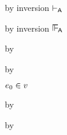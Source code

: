 {\begin{lamportproof*}
    \begin{pfproof}
        \begin{pfproof}
          by inversion $\vdash_{\mathsf{A}}$
        \end{pfproof}
        \begin{pfproof}
          by inversion $\sWLA$
        \end{pfproof}
        \begin{pfproof}
          \qedstep
            \begin{pfproof}
              by \pfih
            \end{pfproof}
        \end{pfproof}
        \begin{pfproof}
          \qedstep
            \begin{pfproof}
              by \pfih
            \end{pfproof}
        \end{pfproof}
        \begin{pfproof}
          \qedstep
            \begin{pfproof}
              $e_0 \in v$
            \end{pfproof}
        \end{pfproof}
    \end{pfproof}

    \begin{pfproof}
      \qedstep
        \begin{pfproof}
          by \pfih
        \end{pfproof}
    \end{pfproof}

    \begin{pfproof}
      \qedstep
        \begin{pfproof}
          by \pfih
        \end{pfproof}
    \end{pfproof}


\end{lamportproof*}}
